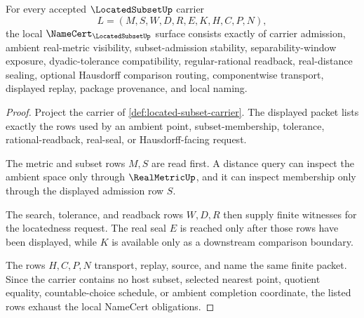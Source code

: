 \begin{theorem}
\label{thm:located-subset-namecert-obligations}
For every accepted $\LocatedSubsetUp$ carrier
$$
L=(M,S,W,D,R,E,K,H,C,P,N),
$$
the local $\NameCert_{\LocatedSubsetUp}$ surface consists exactly of carrier admission, ambient real-metric visibility, subset-admission stability, separability-window exposure, dyadic-tolerance compatibility, regular-rational readback, real-distance sealing, optional Hausdorff comparison routing, componentwise transport, displayed replay, package provenance, and local naming.
\end{theorem}
\begin{proof}
Project the carrier of \autoref{def:located-subset-carrier}. The displayed packet lists exactly the rows used by an ambient point, subset-membership, tolerance, rational-readback, real-seal, or Hausdorff-facing request.

The metric and subset rows $M,S$ are read first. A distance query can inspect the ambient space only through $\RealMetricUp$, and it can inspect membership only through the displayed admission row $S$.

The search, tolerance, and readback rows $W,D,R$ then supply finite witnesses for the locatedness request. The real seal $E$ is reached only after those rows have been displayed, while $K$ is available only as a downstream comparison boundary.

The rows $H,C,P,N$ transport, replay, source, and name the same finite packet. Since the carrier contains no host subset, selected nearest point, quotient equality, countable-choice schedule, or ambient completion coordinate, the listed rows exhaust the local NameCert obligations.
\end{proof}

